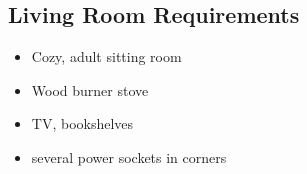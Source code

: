 \subsection{Living Room Requirements}
\begin{itemize}
\item Cozy, adult sitting room
\item Wood burner stove
\item TV, bookshelves
\item several power sockets in corners
    
\end{itemize}
